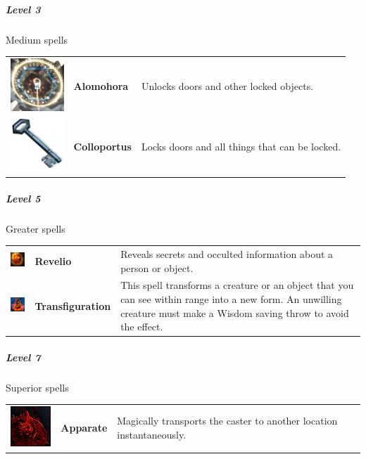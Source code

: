\subparagraph{Level 3} 
Medium spells\\
\begin{tabular}{ m{2cm}m{3cm}m{8cm} } 
	\includegraphics[width=2cm]{../Pictures/Gameplay/Spells/Icon/Alomohora_spell_icon.png} & \textbf{Alomohora} & Unlocks doors and other locked objects. \\ 
   \includegraphics[width=2cm]{../Pictures/Gameplay/Spells/Icon/Colloportus_spell_icon.png} & \textbf{Colloportus} & Locks doors and all things that can be locked. \\ 
\end{tabular}
	

\subparagraph{Level 5} 
Greater spells\\
\begin{tabular}{ m{2cm}m{3cm}m{8cm} } 
	\includegraphics[width=2cm]{../Pictures/Gameplay/Spells/Icon/Revelio_spell_icon.jpg} & \textbf{Revelio} & Reveals secrets and occulted information about a person or object.  \\ 
	\includegraphics[width=2cm]{../Pictures/Gameplay/Spells/Icon/Transfiguration_spell_icon.png} & \textbf{Transfiguration} & This spell transforms a creature or an object that you can see within range into a new form. An unwilling creature must make a Wisdom saving throw to avoid the effect. \\ 
\end{tabular}


\subparagraph{Level 7} 
Superior spells\\
\begin{tabular}{ m{2cm}m{3cm}m{8cm} } 
	\includegraphics[width=2cm]{../Pictures/Gameplay/Spells/Icon/Apparate_spell_icon.png} & \textbf{Apparate} & Magically transports the caster to another location instantaneously.  \\ 
\end{tabular}

